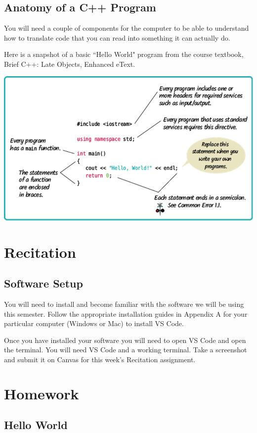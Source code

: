 \subsection{Anatomy of a C++ Program}

You will need a couple of components for the computer to be able to understand how to translate code that you can read into something it can actually do. 

Here is a snapshot of a basic ``Hello World" program from the course textbook,  Brief C++: Late Objects, Enhanced eText. 

\includegraphics[width=\textwidth]{images/hello_world_16.png}

\section{Recitation}
\subsection{Software Setup}
You will need to install and become familiar with the software we will be using this semester. Follow the appropriate installation guides in Appendix A for your particular computer (Windows or Mac) to install VS Code. 

Once you have installed your software you will need to open VS Code and open the terminal. You will need VS Code and a working terminal. Take a screenshot and submit it on Canvas for this week's Recitation assignment. 

\section{Homework}

\subsection{Hello World}

